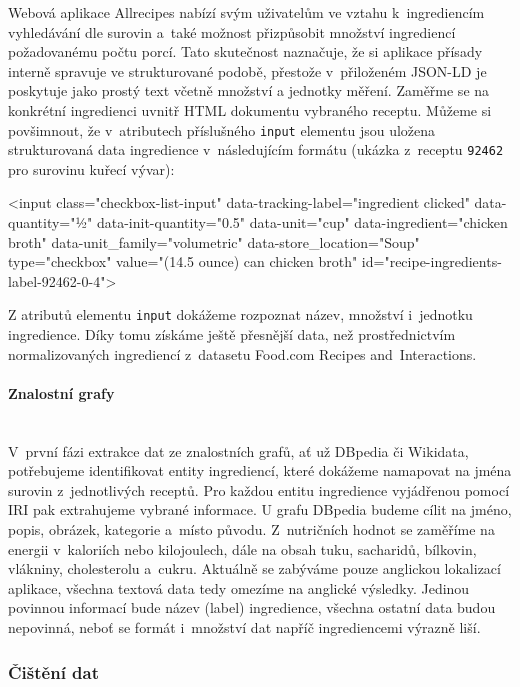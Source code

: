 Webová aplikace Allrecipes nabízí svým uživatelům ve vztahu k~ingrediencím vyhledávání dle surovin a~také možnost přizpůsobit množství ingrediencí požadovanému počtu porcí. Tato skutečnost naznačuje, že si aplikace přísady interně spravuje ve strukturované podobě, přestože v~přiloženém JSON-LD je poskytuje jako prostý text včetně množství a jednotky měření. Zaměřme se na konkrétní ingredienci uvnitř HTML dokumentu vybraného receptu. Můžeme si povšimnout, že v~atributech příslušného \texttt{input} elementu jsou uložena strukturovaná data ingredience v~následujícím formátu (ukázka z~receptu \texttt{92462} pro surovinu kuřecí vývar):

\begin{code}
<input
    class="checkbox-list-input"
    data-tracking-label="ingredient clicked"
    data-quantity="½"
    data-init-quantity="0.5"
    data-unit="cup"
    data-ingredient="chicken broth"
    data-unit_family="volumetric"
    data-store_location="Soup"
    type="checkbox"
    value="(14.5 ounce) can chicken broth"
    id="recipe-ingredients-label-92462-0-4">
\end{code}

Z atributů elementu \texttt{input} dokážeme rozpoznat název, množství i~jednotku ingredience. Díky tomu získáme ještě přesnější data, než prostřednictvím normalizovaných ingrediencí z~datasetu Food.com Recipes and~Interactions.

\paragraph{Znalostní grafy}\mbox{}\\

V~první fázi extrakce dat ze znalostních grafů, ať už DBpedia či Wikidata, potřebujeme identifikovat entity ingrediencí, které dokážeme namapovat na jména surovin z~jednotlivých receptů. Pro každou entitu ingredience vyjádřenou pomocí IRI pak extrahujeme vybrané informace. U grafu DBpedia budeme cílit na jméno, popis, obrázek, kategorie a~místo původu. Z~nutričních hodnot se zaměříme na energii v~kaloriích nebo kilojoulech, dále na obsah tuku, sacharidů, bílkovin, vlákniny, cholesterolu a~cukru. Aktuálně se zabýváme pouze anglickou lokalizací aplikace, všechna textová data tedy omezíme na anglické výsledky. Jedinou povinnou informací bude název (label) ingredience, všechna ostatní data budou nepovinná, neboť se formát i~množství dat napříč ingrediencemi výrazně liší.

\subsubsection{Čištění dat}

